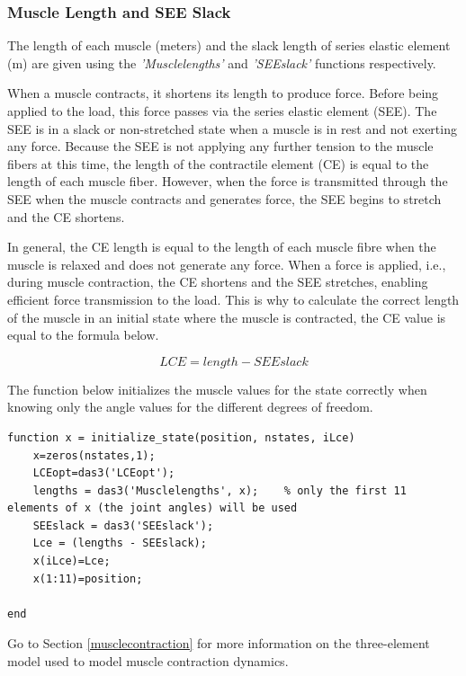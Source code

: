 \subsubsection{Muscle Length and SEE Slack}
The length of each muscle (meters) and the slack length of series elastic element (m) are given using the \textit{'Musclelengths'} and \textit{'SEEslack'} functions respectively. 

When a muscle contracts, it shortens its length to produce force. Before being applied to the load, this force passes via the series elastic element (SEE). The SEE is in a slack or non-stretched state when a muscle is in rest and not exerting any force. Because the SEE is not applying any further tension to the muscle fibers at this time, the length of the contractile element (CE) is equal to the length of each muscle fiber. However, when the force is transmitted through the SEE when the muscle contracts and generates force, the SEE begins to stretch and the CE shortens. 

In general, the CE length is equal to the length of each muscle fibre when the muscle is relaxed and does not generate any force. When a force is applied, i.e., during muscle contraction, the CE shortens and the SEE stretches, enabling efficient force transmission to the load. This is why to calculate the correct length of the muscle in an initial state where the muscle is contracted, the CE value is equal to the formula below.

\begin{equation}
    LCE = length - SEEslack \label{LCE}
\end{equation}

The function below initializes the muscle values for the state correctly when knowing only the angle values for the different degrees of freedom.\newpage

\begin{lstlisting}[style=Matlab-editor]
function x = initialize_state(position, nstates, iLce)
    x=zeros(nstates,1);
    LCEopt=das3('LCEopt');
    lengths = das3('Musclelengths', x);    % only the first 11 elements of x (the joint angles) will be used
    SEEslack = das3('SEEslack');
    Lce = (lengths - SEEslack);
    x(iLce)=Lce;
    x(1:11)=position;

end
\end{lstlisting}

Go to Section \ref{musclecontraction} for more information on the three-element model used to model muscle contraction dynamics. \newline

